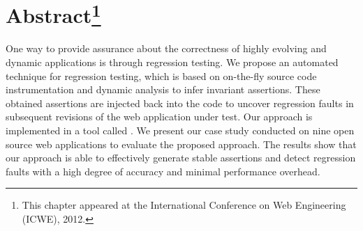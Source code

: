 \section*{Abstract\footnote{This chapter appeared at the International Conference on Web Engineering (ICWE), 2012.}}
One way to provide assurance about the correctness of highly evolving and dynamic applications is through regression testing. We propose an automated technique for \javascript regression testing, which is based on on-the-fly \javascript source code instrumentation and dynamic analysis to infer invariant assertions. These obtained assertions are injected back into the \javascript code to uncover regression faults in subsequent revisions of the web application under test.
Our approach is implemented in a tool called \jsart. We present our case study conducted on nine open source web applications to evaluate the proposed approach. The results show that our approach is able to effectively generate stable assertions and detect \javascript regression faults with a high degree of accuracy and minimal performance overhead.


